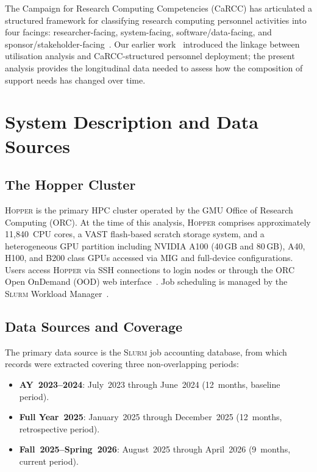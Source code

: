 \documentclass[11pt,letterpaper]{article}
\newcommand{\hopper}{\textsc{Hopper}}
\newcommand{\slurm}{\textsc{Slurm}}
\newcommand{\orc}{ORC}
\newcommand{\gmu}{GMU}
\begin{document}
The Campaign for Research Computing Competencies (CaRCC) has articulated a
structured framework for classifying research computing personnel activities
into four facings: researcher-facing, system-facing, software/data-facing, and
sponsor/stakeholder-facing~\citep{carcc2022}.  Our earlier work~\citep{orc2022internal}
introduced the linkage between utilisation analysis and CaRCC-structured personnel
deployment; the present analysis provides the longitudinal data needed to assess
how the composition of support needs has changed over time.

\section{System Description and Data Sources}
\label{sec:system}

\subsection{The Hopper Cluster}

\hopper{} is the primary HPC cluster operated by the \gmu{} Office of Research
Computing (\orc).  At the time of this analysis, \hopper{} comprises approximately
11,840~CPU cores, a VAST flash-based scratch storage system, and a heterogeneous
GPU partition including NVIDIA A100 (40\,GB and 80\,GB), A40, H100, and B200
class GPUs accessed via MIG and full-device configurations.  Users access \hopper{}
via SSH connections to login nodes or through the \orc{} Open OnDemand (OOD) web
interface~\citep{hudak2016}.  Job scheduling is managed by the \slurm{} Workload
Manager~\citep{yoo2003}.

\subsection{Data Sources and Coverage}

The primary data source is the \slurm{} job accounting database, from which
records were extracted covering three non-overlapping periods:

\begin{itemize}[leftmargin=2em]
  \item \textbf{AY~2023--2024}: July~2023 through June~2024 (12~months,
        baseline period).
  \item \textbf{Full Year~2025}: January~2025 through December~2025
        (12~months, retrospective period).
  \item \textbf{Fall~2025--Spring~2026}: August~2025 through April~2026
        (9~months, current period).
\end{itemize}
\end{document}
